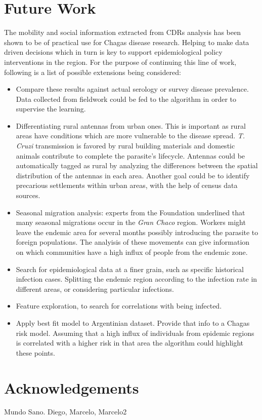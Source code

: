 \section{Future Work}

The mobility and social information extracted from CDRs analysis has been shown to be of practical use for Chagas disease research. Helping to make data driven decisions which in turn is key to support epidemiological policy interventions in the region. For the purpose of continuing this line of work, following is a list of possible extensions being considered:

\begin{itemize}
    \item Compare these results against actual serology or survey disease prevalence. Data collected from fieldwork could be fed to the algorithm in order to supervise the learning. 
    \item Differentiating rural antennas from urban ones. This is important as rural areas have conditions which are more vulnerable to the disease spread. \textit{T. Cruzi} transmission is favored by rural building materials and domestic animals contribute to complete the parasite's lifecycle. Antennas could be automatically tagged as rural by analyzing the differences between the spatial distribution of the antennas in each area. Another goal could be to identify precarious settlements within urban areas, with the help of census data sources.
    \item Seasonal migration analysis:  experts from the Foundation underlined that many seasonal migrations occur in the \textit{Gran Chaco} region.  Workers might leave the endemic area for several months possibly introducing the parasite to foreign populations. The analyisis of these movements can give information on which communities have a high influx of people from the endemic zone.
    \item Search for epidemiological data at a finer grain, such as specific historical infection cases. Splitting the endemic region according to the infection rate in different areas, or considering particular infections.
    \item Feature exploration, to search for correlations with being infected.
    \item Apply best fit model to Argentinian dataset. Provide that info to a Chagas risk model. Assuming that a high influx of individuals from epidemic regions is correlated with a higher risk in that area the algorithm could highlight these points. %
\end{itemize}

\section{Acknowledgements}
Mundo Sano. Diego, Marcelo, Marcelo2